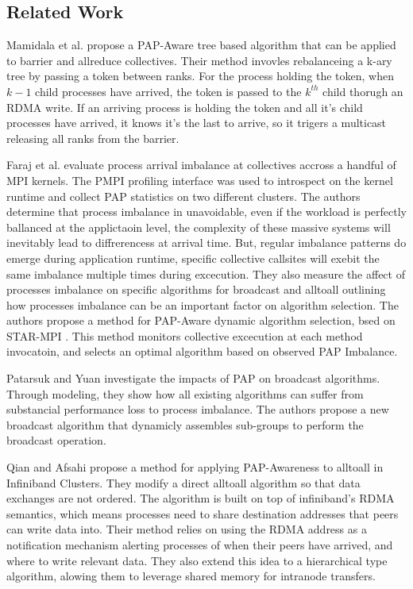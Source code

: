 \subsection{Related Work}

Mamidala et al. \cite{Mamidala2004BarrierAllreduceIBAdaptive} propose a PAP-Aware tree based algorithm that can be applied to barrier and allreduce collectives.
Their method invovles rebalanceing a k-ary tree by passing a token between ranks.
For the process holding the token, when $k-1$ child processes have arrived, the token is passed to the $k^{th}$ child thorugh an RDMA write.
If an arriving process is holding the token and all it's child processes have arrived, it knows it's the last to arrive, so it trigers a multicast releasing all ranks from the barrier. 

Faraj et al. \cite{Faraj2008StudyProcArrivalMPIColl} evaluate process arrival imbalance at collectives accross a handful of MPI kernels.
The PMPI profiling interface was used to introspect on the kernel runtime and collect PAP statistics on two different clusters.
The authors determine that process imbalance in unavoidable, even if the workload is perfectly ballanced at the applictaoin level, the complexity of these massive systems will inevitably lead to diffrerencess at arrival time. 
But, regular imbalance patterns do emerge during application runtime, specific collective callsites will exebit the same imbalance multiple times during excecution.
They also measure the affect of processes imbalance on specific algorithms for broadcast and alltoall outlining how processes imbalance can be an important factor on algorithm selection.
The authors propose a method for PAP-Aware dynamic algorithm selection, bsed on STAR-MPI \cite{Faraj2006StarMPI}.
This method monitors collective excecution at each method invocatoin, and selects an optimal algorithm based on observed PAP Imbalance. 

Patarsuk and Yuan \cite{Patarasuk2008EffBcastDifProcArr} investigate the impacts of PAP on broadcast algorithms.
Through modeling, they show how all existing algorithms can suffer from substancial performance loss to process imbalance. 
The authors propose a new broadcast algorithm that dynamicly assembles sub-groups to perform the broadcast operation.

Qian and Afsahi \cite{Qian2009ProcArrivalSHMA2AIB} propose a method for applying PAP-Awareness to alltoall in Infiniband Clusters.
They modify a direct alltoall algorithm so that data exchanges are not ordered.
The algorithm is built on top of infiniband's RDMA semantics, which means processes need to share destination addresses that peers can write data into. 
Their method relies on using the RDMA address as a notification mechanism alerting processes of when their peers have arrived, and where to write relevant data.
They also extend this idea to a hierarchical type algorithm, alowing them to leverage shared memory for intranode transfers.

